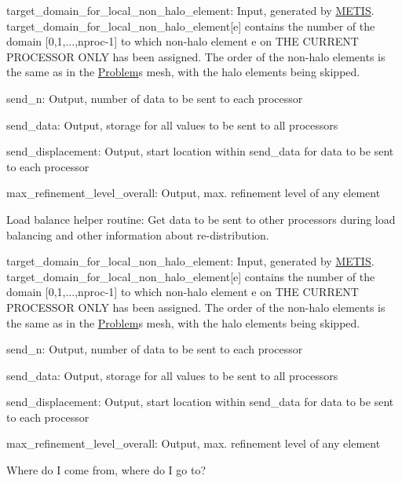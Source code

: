 \begin{DoxyItemize}
\item target\+\_\+domain\+\_\+for\+\_\+local\+\_\+non\+\_\+halo\+\_\+element\+: Input, generated by \hyperlink{namespaceoomph_1_1METIS}{M\+E\+T\+IS}. target\+\_\+domain\+\_\+for\+\_\+local\+\_\+non\+\_\+halo\+\_\+element\mbox{[}e\mbox{]} contains the number of the domain \mbox{[}0,1,...,nproc-\/1\mbox{]} to which non-\/halo element e on T\+HE C\+U\+R\+R\+E\+NT P\+R\+O\+C\+E\+S\+S\+OR O\+N\+LY has been assigned. The order of the non-\/halo elements is the same as in the \hyperlink{classoomph_1_1Problem}{Problem}\textquotesingle{}s mesh, with the halo elements being skipped.
\item send\+\_\+n\+: Output, number of data to be sent to each processor
\item send\+\_\+data\+: Output, storage for all values to be sent to all processors
\item send\+\_\+displacement\+: Output, start location within send\+\_\+data for data to be sent to each processor
\item max\+\_\+refinement\+\_\+level\+\_\+overall\+: Output, max. refinement level of any element
\end{DoxyItemize}

Load balance helper routine\+: Get data to be sent to other processors during load balancing and other information about re-\/distribution.
\begin{DoxyItemize}
\item target\+\_\+domain\+\_\+for\+\_\+local\+\_\+non\+\_\+halo\+\_\+element\+: Input, generated by \hyperlink{namespaceoomph_1_1METIS}{M\+E\+T\+IS}. target\+\_\+domain\+\_\+for\+\_\+local\+\_\+non\+\_\+halo\+\_\+element\mbox{[}e\mbox{]} contains the number of the domain \mbox{[}0,1,...,nproc-\/1\mbox{]} to which non-\/halo element e on T\+HE C\+U\+R\+R\+E\+NT P\+R\+O\+C\+E\+S\+S\+OR O\+N\+LY has been assigned. The order of the non-\/halo elements is the same as in the \hyperlink{classoomph_1_1Problem}{Problem}\textquotesingle{}s mesh, with the halo elements being skipped.
\item send\+\_\+n\+: Output, number of data to be sent to each processor
\item send\+\_\+data\+: Output, storage for all values to be sent to all processors
\item send\+\_\+displacement\+: Output, start location within send\+\_\+data for data to be sent to each processor
\item max\+\_\+refinement\+\_\+level\+\_\+overall\+: Output, max. refinement level of any element 
\end{DoxyItemize}Where do I come from, where do I go to?

